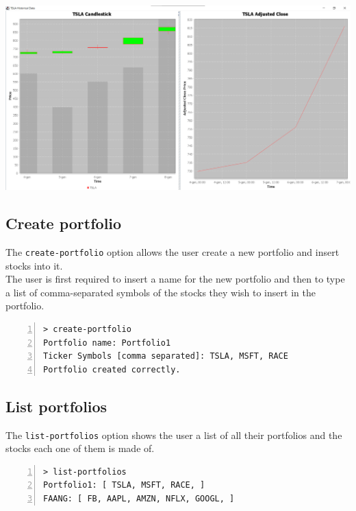\hfill \break
{\centering
\includegraphics[scale=0.32]{img/user_manual/view_stock.png}\\
}

\subsection{Create portfolio}
The \texttt{create-portfolio} option allows the user create a new portfolio and insert stocks into it.\\
The user is first required to insert a name for the new portfolio and then to type a list of comma-separated symbols of the stocks they wish to insert in the portfolio.

\begin{lstlisting}[basicstyle=\footnotesize\ttfamily,language={},numbers=left,keepspaces=true,tabsize=4,
numberstyle=\footnotesize,numbersep=8pt,frame=single]
> create-portfolio
Portfolio name: Portfolio1
Ticker Symbols [comma separated]: TSLA, MSFT, RACE
Portfolio created correctly.

\end{lstlisting}

\subsection{List portfolios}
The \texttt{list-portfolios} option shows the user a list of all their portfolios and the stocks each one of them is made of.\\

\begin{lstlisting}[basicstyle=\footnotesize\ttfamily,language={},numbers=left,keepspaces=true,tabsize=4,
numberstyle=\footnotesize,numbersep=8pt,frame=single]
> list-portfolios
Portfolio1: [ TSLA, MSFT, RACE, ]
FAANG: [ FB, AAPL, AMZN, NFLX, GOOGL, ]
\end{lstlisting}

